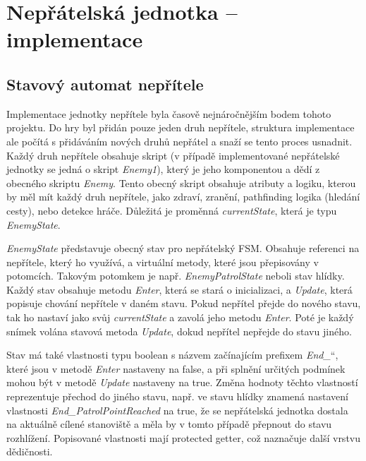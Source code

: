 \documentclass[FM,Proj]{tulthesis}
\begin{document}
	
	
	\section{Nepřátelská jednotka – implementace} %
	\label{chpFSM}
	
	\subsection{Stavový automat nepřítele}
	
	Implementace jednotky nepřítele byla časově nejnáročnějším bodem tohoto projektu. Do hry byl přidán pouze jeden druh nepřítele, struktura implementace ale počítá s přidáváním nových druhů nepřátel a snaží se tento proces usnadnit. Každý druh nepřítele obsahuje skript (v případě implementované nepřátelské jednotky se jedná o skript \textit{Enemy1}), který je jeho komponentou a dědí z obecného skriptu \textit{Enemy}. Tento obecný skript obsahuje atributy a logiku, kterou by měl mít každý druh nepřítele, jako zdraví, zranění, pathfinding logika (hledání cesty), nebo detekce hráče. Důležitá je proměnná \textit{currentState}, která je typu \textit{EnemyState}.
	
	\textit{EnemyState} představuje obecný stav pro nepřátelský FSM. Obsahuje referenci na nepřítele, který ho využívá, a virtuální metody, které jsou přepisovány v potomcích. Takovým potomkem je např. \textit{EnemyPatrolState} neboli stav hlídky. Každý stav obsahuje metodu \textit{Enter}, která se stará o inicializaci, a \textit{Update}, která popisuje chování nepřítele v daném stavu.  Pokud nepřítel přejde do nového stavu, tak ho nastaví jako svůj \textit{currentState} a zavolá jeho metodu \textit{Enter}. Poté je každý snímek volána stavová metoda \textit{Update}, dokud nepřítel nepřejde do stavu jiného.
	
	Stav má také vlastnosti typu boolean s názvem začínajícím prefixem \quotedblbase \textit{End\_}\textquotedblleft , které jsou v metodě \textit{Enter} nastaveny na false, a při splnění určitých podmínek mohou být v metodě \textit{Update} nastaveny na true. Změna hodnoty těchto vlastností reprezentuje přechod do jiného stavu, např. ve stavu hlídky znamená nastavení vlastnosti \textit{End\_PatrolPointReached} na true, že se nepřátelská jednotka dostala na aktuálně cílené stanoviště a měla by v tomto případě přepnout do stavu rozhlížení. Popisované vlastnosti mají protected getter, což naznačuje další vrstvu dědičnosti.
	
\end{document}

